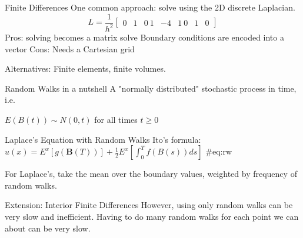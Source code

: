 \documentclass{beamer}
\begin{document}
\begin{frame}{Finite Differences}
One common approach: solve using the 2D discrete Laplacian.
	\[ L = \frac{1}{h^2} \begin{bmatrix} 
		0 & 1 & 0 \
		1 & -4& 1 \
		0 & 1 & 0 
	\end{bmatrix} \]
Pros: solving becomes a matrix solve
Boundary conditions are encoded into a vector
Cons: Needs a Cartesian grid

Alternatives: Finite elements, finite volumes.
\end{frame}
\begin{frame}{Random Walks in a nutshell}
A "normally distributed" stochastic process in time, i.e.
	
$E(B(t)) \sim N(0, t)$ for all times $t \geq 0$
\end{frame}

\begin{frame}{Laplace's Equation with Random Walks}
Ito's formula:
$u(x) = E^x[ g(\mathbf{B}(T))] + \frac{1}{2} E^x \left[ \int_0^T f(B(s))ds \right]$ {#eq:rw}

For Laplace's, take the mean over the boundary values, weighted by frequency of random walks.
\end{frame}



\begin{frame}{Extension: Interior Finite Differences}
However, using only random walks can be very slow and inefficient.
Having to do many random walks for each point we can about can be very slow.
\end{frame}
\end{document}
